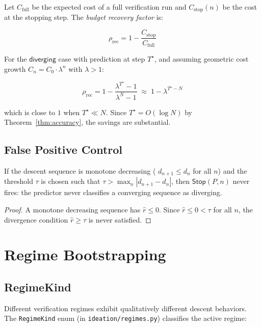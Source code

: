 \documentclass[11pt]{article}
\newcommand{\DescentRate}{r}                %
\newcommand{\EarlyStop}{\mathsf{Stop}}      %
\newcommand{\Thresh}{\tau}                  %
\newcommand{\StepsToDecide}{T^{\star}}      %
\newcommand{\maxstep}{N}                    %
\begin{document}
Let $C_{\mathrm{full}}$ be the expected cost of a full verification run
and $C_{\mathrm{stop}}(n)$ be the cost at the stopping step.  The
\emph{budget recovery factor} is:

\[
  \rho_{\mathrm{rec}} = 1 - \frac{C_{\mathrm{stop}}}{C_{\mathrm{full}}}
\]

For the $\mathsf{diverging}$ case with prediction at step $\StepsToDecide$,
and assuming geometric cost growth $C_n = C_0 \cdot \lambda^n$ with
$\lambda > 1$:

\[
  \rho_{\mathrm{rec}} = 1 - \frac{\lambda^{\StepsToDecide} - 1}{\lambda^{\maxstep} - 1}
  \;\approx\; 1 - \lambda^{\StepsToDecide - \maxstep}
\]

which is close to $1$ when $\StepsToDecide \ll \maxstep$.  Since
$\StepsToDecide = O(\log \maxstep)$ by Theorem~\ref{thm:accuracy}, the
savings are substantial.

\subsection{False Positive Control}

\begin{proposition}\label{prop:fp-control}
If the descent sequence is monotone decreasing (\ie{} $d_{n+1} \le d_n$
for all $n$) and the threshold $\Thresh$ is chosen such that
$\Thresh > \max_{n} |d_{n+1} - d_n|$, then $\EarlyStop(P,n)$ never
fires: the predictor never classifies a converging sequence as
diverging.
\end{proposition}

\begin{proof}
A monotone decreasing sequence has $\hat{\DescentRate} \le 0$.  Since
$\hat{\DescentRate} \le 0 < \Thresh$ for all $n$, the divergence
condition $\hat{\DescentRate} \ge \Thresh$ is never satisfied.
\end{proof}

\section{Regime Bootstrapping}\label{sec:regime}

\subsection{RegimeKind}

Different verification regimes exhibit qualitatively different descent
behaviors.  The \texttt{RegimeKind} enum (in
\texttt{ideation/regimes.py}) classifies the active regime:
\end{document}
